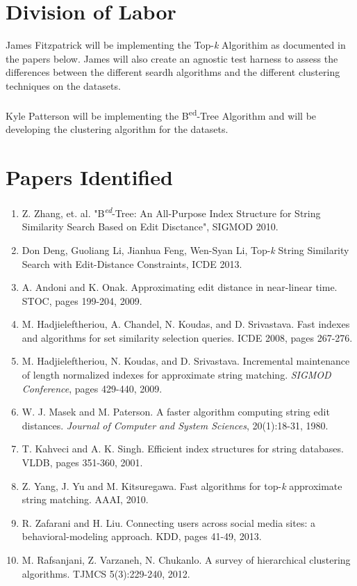 \documentclass[pdftex,12pt,letter]{article}
\begin{document}
\section{Division of Labor}
James Fitzpatrick will be implementing the Top-\textit{k}  Algorithim as documented in the papers below. James will also create an agnostic test harness to assess the differences between the different seardh algorithms and the different clustering techniques on the datasets. 
\\\\
Kyle Patterson will be implementing the B\textsuperscript{ed}-Tree Algorithm and will be developing the clustering algorithm for the datasets. 

\section{Papers Identified}
\begin{enumerate}
\item Z. Zhang, et. al. "B\textsuperscript{\textit{ed}}-Tree: An All-Purpose Index Structure for String Similarity Search Based on Edit Disctance", SIGMOD 2010.
\item Don Deng, Guoliang Li, Jianhua Feng, Wen-Syan Li, Top-\textit{k} String Similarity Search with Edit-Distance Constraints, ICDE 2013.
\item A. Andoni and K. Onak. Approximating edit distance in near-linear time. STOC, pages 199-204, 2009.
\item M. Hadjieleftheriou, A. Chandel, N. Koudas, and D. Srivastava. Fast indexes and algorithms for set similarity selection queries. ICDE 2008, pages 267-276.
\item M. Hadjieleftheriou, N. Koudas, and D. Srivastava. Incremental maintenance of length normalized indexes for approximate string matching. \textit{SIGMOD Conference}, pages 429-440, 2009.
\item W. J. Masek and M. Paterson. A faster algorithm computing string edit distances. \textit{Journal of Computer and System Sciences}, 20(1):18-31, 1980.
\item T. Kahveci and A. K. Singh. Efficient index structures for string databases. VLDB, pages 351-360, 2001.
\item Z. Yang, J. Yu and M. Kitsuregawa. Fast algorithms for top-\textit{k} approximate string matching. AAAI, 2010.
\item R. Zafarani and H. Liu. Connecting users across social media sites: a behavioral-modeling approach. KDD, pages 41-49, 2013.
\item M. Rafsanjani, Z. Varzaneh, N. Chukanlo. A survey of hierarchical clustering algorithms. TJMCS 5(3):229-240, 2012.

\end{enumerate}
\FloatBarrier
\end{document}
